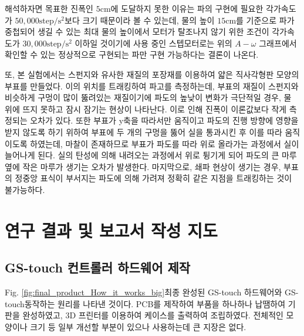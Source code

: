 해석하자면 목표한 진폭인 $5\mathrm{cm}$에 도달하지 못한 이유는 파의 구현에 필요한 각가속도가 $50,000\mathrm{step/s^2}$보다 크기 때문이라 볼 수 있는데, 물의 높이 $15\mathrm{cm}$를 기준으로 파가 중첩되어 생길 수 있는 최대 물의 높이에서 모터가 탈조나지 않기 위한 조건이 각가속도가 $30,000\mathrm{step/s^2}$ 이하일 것이기에 사용 중인 스텝모터로는 위의 $A-\omega$ 그래프에서 확인할 수 있는 정상적으로 구현되는 파만 구현 가능하다는 결론이 나온다.




또, 본 실험에서는 스펀지와 유사한 재질의 포장재를 이용하여 얇은 직사각형판 모양의 부표를 만들었다. 이의 위치를 트래킹하여 파고를 측정하는데, 부표의 재질이 스펀지와 비슷하게 구멍이 많이 뚫려있는 재질이기에 파도의 높낮이 변화가 극단적일 경우, 물 위에 뜨지 못하고 잠시 잠기는 현상이 나타난다. 이로 인해 진폭이 이론값보다 작게 측정되는 오차가 있다. 또한 부표가 y축을 따라서만 움직이고 파도의 진행 방향에 영향을 받지 않도록 하기 위하여 부표에 두 개의 구멍을 뚫어 실을 통과시킨 후 이를 따라 움직이도록 하였는데, 마찰이 존재하므로 부표가 파도를 따라 위로 올라가는 과정에서 실이 늘어나게 된다. 실의 탄성에 의해 내려오는 과정에서 위로 튕기게 되어 파도의 큰 마루 옆에 작은 마루가 생기는 오차가 발생한다. 마지막으로, 쇄파 현상이 생기는 경우, 부표의 정중앙 표식이 부서지는 파도에 의해 가려져 정확히 같은 지점을 트래킹하는 것이 불가능하다.



\section{연구 결과 및 보고서 작성 지도}

\subsection{GS-touch 컨트롤러 하드웨어 제작}

Fig. \ref{fig:final_product_How_it_works_big}\는 최종 완성된 GS-touch 하드웨어와 GS-touch\가 동작하는 원리를  나타낸 것이다. PCB를 제작하여 부품을 하나하나 납땜하여 기판을 완성하였고, 3D 프린터를 이용하여 케이스를 출력하여 조립하였다. 전체적인 모양이나 크기 등 일부 개선할 부분이 있으나 사용하는데 큰 지장은 없다.

